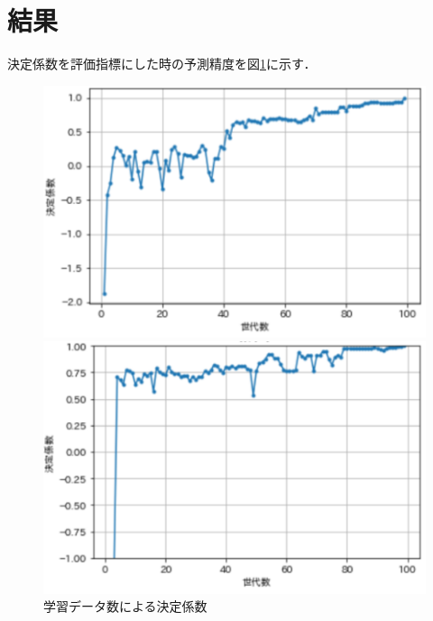 \documentclass[main]{subfiles}
\begin{document}
    \section{結果}
    決定係数を評価指標にした時の予測精度を図\ref{data_1}に示す．
    \begin{figure}
        \begin{minipage}[b]{0.45\linewidth}
          \centering
          \includegraphics[width=\linewidth]{figures/s_r.png}
        \end{minipage}
        \begin{minipage}[b]{0.45\linewidth}
          \centering
          \includegraphics[width=\linewidth]{figures/s_mae.png}
        \end{minipage}
        \caption{学習データ数による決定係数}
        \label{data_1}
      \end{figure}
      
\end{document}

